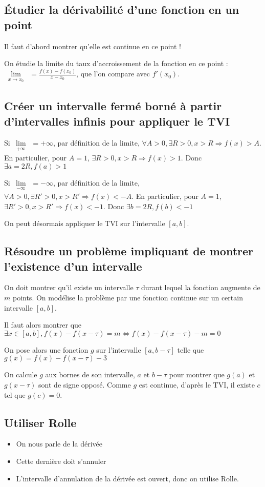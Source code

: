 \documentclass[french]{yLectureNote}
\newcommand{\Lim}[1]{\lim\limits_{\substack{#1}}\:}
\begin{document}
\subsection{Étudier la dérivabilité d'une fonction en un point}
Il faut d'abord montrer qu'elle est continue en ce point !

On étudie la limite du taux d'accroissement de la fonction en ce point : $\Lim{x\to x_0} = \frac{f(x)-f(x_0)}{x-x_0}$, que l'on compare avec $f'(x_0)$.

\subsection{Créer un intervalle fermé borné à partir d'intervalles infinis pour appliquer le TVI}
Si $\Lim{+\infty} = + \infty$, par définition de la limite, $\forall A>0, \exists R>0, x>R \Rightarrow f(x)>A$. En particulier, pour $A = 1$, $\exists R>0, x>R \Rightarrow f(x)>1$. Donc $\exists a = 2R, f(a)>1$

Si $\Lim{-\infty} = - \infty$, par définition de la limite, $\forall A>0, \exists R'>0, x>R' \Rightarrow f(x)<-A$. En particulier, pour $A = 1$, $\exists R'>0, x>R' \Rightarrow f(x)<-1$. Donc $\exists b = 2R, f(b)<-1$

On peut désormais appliquer le TVI sur l'intervalle $[a,b]$.
\subsection{Résoudre un problème impliquant de montrer l'existence d'un intervalle}
On doit montrer qu'il existe un intervalle $\tau$ durant lequel la fonction augmente de $m$ points.
On modélise la problème par une fonction continue sur un certain intervalle $[a,b]$.

Il faut alors montrer que $\exists x\in [a,b], f(x)-f(x-\tau) = m \iff f(x)-f(x-\tau) -m =0$

On pose alors une fonction $g$ sur l'intervalle $[a,b-\tau]$ telle que $g(x) = f(x)-f(x-\tau)-3$

On calcule $g$ aux bornes de son intervalle, $a$ et $b-\tau$ pour montrer que $g(a)$ et $g(x-\tau)$ sont de signe opposé. Comme $g$ est continue, d'après le TVI, il existe $c$ tel que $g(c) = 0$.
\subsection{Utiliser Rolle}
\begin{itemize}
 \item On nous parle de la dérivée

\item Cette dernière doit s'annuler

\item L'intervalle d'annulation de la dérivée est ouvert, donc on utilise Rolle.
\end{itemize}
\end{document}
